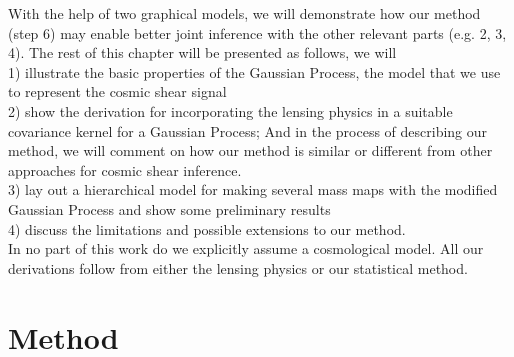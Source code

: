 With the help of two graphical models, we will demonstrate how our method
(step 6) may enable better joint inference with the other relevant parts (e.g. 2, 3, 4). 
The rest of this chapter will be presented as follows, we will \\ 
1) illustrate the basic properties of the Gaussian Process, the model that we
use to represent the cosmic shear signal\\ 
2) show the derivation for incorporating the lensing physics in 
a suitable covariance kernel for a Gaussian Process;  
And in the process of describing our method, we will comment on how our method is  
similar or different from other approaches for cosmic shear inference. \\
3) lay out a hierarchical model for making several mass maps 
with the modified Gaussian Process and show some preliminary results \\ 
4) discuss the limitations and possible extensions to our method.\\

In no part of this work do we explicitly assume a cosmological model. All our
derivations follow from either the lensing physics or our statistical method.   


\section{Method}


